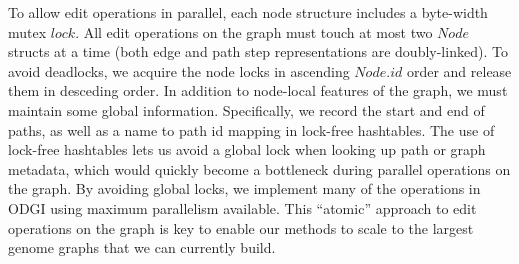 \documentclass{bioinfo}
\begin{document}
To allow edit operations in parallel, each node structure includes a byte-width mutex $lock$.
All edit operations on the graph must touch at most two $Node$ structs at a time (both edge and path step representations are doubly-linked).
To avoid deadlocks, we acquire the node locks in ascending $Node.id$ order and release them in desceding order.
In addition to node-local features of the graph, we must maintain some global information.
Specifically, we record the start and end of paths, as well as a name to path id mapping in lock-free hashtables.
The use of lock-free hashtables lets us avoid a global lock when looking up path or graph metadata, which would quickly become a bottleneck during parallel operations on the graph.
By avoiding global locks, we implement many of the operations in ODGI using maximum parallelism available.
This ``atomic'' approach to edit operations on the graph is key to enable our methods to scale to the largest genome graphs that we can currently build.

\begin{comment}

In the variation graph model, paths have to respect the graph’s topology: this can be verified with odgi validate, to ensure no errors in the input or edited graphs.
In variation graphs the coordinates are provided by the embedded path sequences.
Indeed, the node IDs are not meant to be stable. odgi position finds, translates, and liftovers graph and path positions between different graphs by exploiting their shared path sequences (Figure 1.B).
\end{comment}

\begin{comment}
key message of the paper is that we have collected a set of algorithms that enable easy use of pangenome graphs for investigating biology
-> build model solves problem of working with big graphs in memory
-> view (convert to GFA) & paths solve problem of exporting basic features of the graph (e.g. paths)
-> stats (understand basic size / structure) & bin & degree & depth solves problem of understanding the overall structure and size of the graph
-> sort (groom) & layout solves problem of finding latent structure in the pangenome
-> viz & draw provides a human-viewable readout of the graph
-> chop & unchop & squeeze & break & prune & explode lets us break apart or combine the graph nodes and topology
-> position & tips & untangle (jaccard based coordinate conversion) provides a way to map coordinates between any genomes in the graph (e.g. liftover!)
-> extract lets us pull out specific regions of the graph based on path ranges, nodes and positions
\end{comment}
\end{document}
